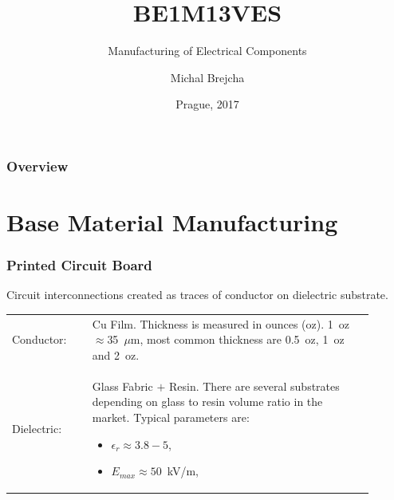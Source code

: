 \documentclass{beamer}
\title[BE1M13VES]{BE1M13VES}
\subtitle[Manufacturing of Electrical Components] {Manufacturing of Electrical Components}
\author[Brejcha]{Michal Brejcha}
\institute[CTU]{CTU in Prague}
\date[Prague, 2017]{Prague, 2017}
\begin{document}
\frame{\titlepage}

\begin{frame}
\frametitle{Overview} 
\tableofcontents
\end{frame}


\section{\texorpdfstring{Base Material Manufacturing}{Base Material Manufacturing}}
	\begin{frame}
    \frametitle{Printed Circuit Board}
		Circuit interconnections created as traces of conductor on dielectric substrate.\\

		\begin{center}
			\begin{tabular}{p{0.2\linewidth} p{0.7\linewidth}}
			Conductor: & Cu Film. Thickness is measured in ounces (oz). 1~oz$\approx$35~$\mu$m, most common thickness are 0.5~oz, 1~oz and 2~oz.\\
			Dielectric: & Glass Fabric $+$ Resin. There are several substrates depending on glass to resin volume ratio in the market. Typical parameters are:
			
			\begin{itemize}
				\item $\epsilon_r\approx 3.8 - 5$,
				\item $E_{max}\approx 50$~kV/m,
			\end{itemize}
			\end{tabular}
		\end{center}
	\end{frame}
\end{document}
